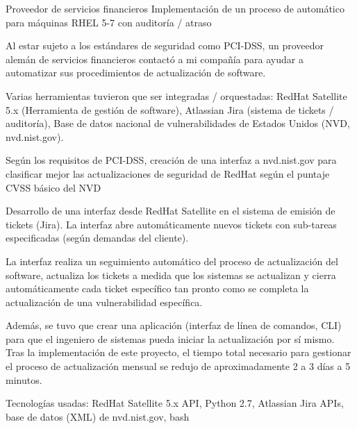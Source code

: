 \begin{cventries}
  \cventry
    {Proveedor de servicios financieros}
    {Implementación de un proceso de  automático para máquinas RHEL 5-7 con auditoría / atraso}
    {}
    {}
    {
      \begin{cvitems}
      \item Al estar sujeto a los estándares de seguridad como PCI-DSS, un proveedor alemán de servicios financieros contactó a mi compañía para ayudar a automatizar sus procedimientos de actualización de software.
 \item Varias herramientas tuvieron que ser integradas / orquestadas: RedHat Satellite 5.x (Herramienta de gestión de software), Atlassian Jira (sistema de tickets / auditoría), Base de datos nacional de vulnerabilidades de Estados Unidos (NVD, nvd.nist.gov).
 \item Según los requisitos de PCI-DSS, creación de una interfaz a nvd.nist.gov para clasificar mejor las actualizaciones de seguridad de RedHat según el puntaje CVSS básico del NVD
 \item Desarrollo de una interfaz desde RedHat Satellite en el sistema de emisión de tickets (Jira). La interfaz abre automáticamente nuevos tickets con sub-tareas especificadas (según demandas del cliente).
 \item La interfaz realiza un seguimiento automático del proceso de actualización del software, actualiza los tickets a medida que los sistemas se actualizan y cierra automáticamente cada ticket específico tan pronto como se completa la actualización de una vulnerabilidad específica.
 \item Además, se tuvo que crear una aplicación (interfaz de línea de comandos, CLI) para que el ingeniero de sistemas pueda iniciar la actualización por sí mismo. Tras la implementación de este proyecto, el tiempo total necesario para gestionar el proceso de actualización mensual se redujo de aproximadamente 2 a 3 días a 5 minutos.
 \item Tecnologías usadas: RedHat Satellite 5.x API, Python 2.7, Atlassian Jira APIs, base de datos (XML) de nvd.nist.gov, bash
      \end{cvitems}
    }


\end{cventries}
